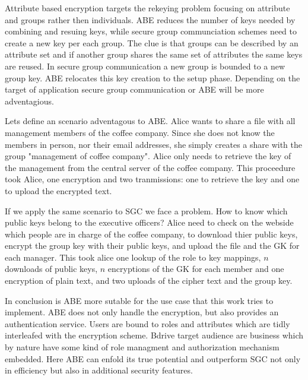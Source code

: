 Attribute based encryption targets the rekeying problem focusing on attribute and groups rather then individuals. ABE reduces the number of keys needed by combining and resuing keys, while secure group communciation schemes need to create a new key per each group. The clue is that groups can be described by an attribute set and if another group shares the same set of attributes the same keys are reused. In secure group communication a new group is bounded to a new group key. ABE relocates this key creation to the setup phase. Depending on the target of application secure group communication or ABE will be more adventagious.

Lets define an scenario adventagous to ABE. Alice wants to share a file with all management members of the coffee company. Since she does not know the members in person, nor their email addresses, she simply creates a share with the group "management of coffee company". Alice only needs to retrieve the key of the management from the central server of the coffee company. This proceedure took Alice, one encryption and two tranmissions: one to retrieve the key and one to upload the encrypted text. 

If we apply the same scenario to SGC we face a problem. How to know which public keys belong to the executive officers? Alice need to check on the webside which people are in charge of the coffee company, to download thier public keys, encrypt the group key with their public keys, and upload the file and the GK for each manager. This took alice one lookup of the role to key mappings, $n$ downloads of public keys, $n$ encryptions of the GK for each member and one encryption of plain text, and two uploads of the cipher text and the group key.         

In conclusion is ABE more sutable for the use case that this work tries to implement. ABE does not only handle the encryption, but also provides an authentication service. Users are bound to roles and attributes which are tidly interleafed with the encryption scheme. Bdrive target audience are business which by nature have some kind of role managment and authorization mechanism embedded. Here ABE can enfold its true potential and outperform SGC not only in efficiency but also in additional security features. 



